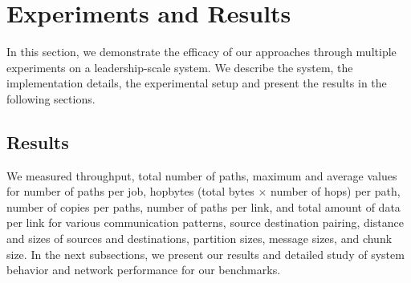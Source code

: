 \section{Experiments and Results}
\label{sec:benchmark}

In this section, we demonstrate the efficacy of our approaches through multiple experiments on a leadership-scale system. We describe the system, the implementation details, the experimental setup and present the results in the following sections.







\subsection{Results}
\label{sec:results}

We measured throughput, total number of paths, maximum and average values for number of paths per job, hopbytes (total bytes $\times$ number of hops) per path, number of copies per paths, number of paths per link, and total amount of data per link for various communication patterns, source destination pairing, distance and sizes of sources and destinations, partition sizes, message sizes, and chunk size. In the next subsections, we present our results and detailed study of system behavior and network performance for our benchmarks.









%










